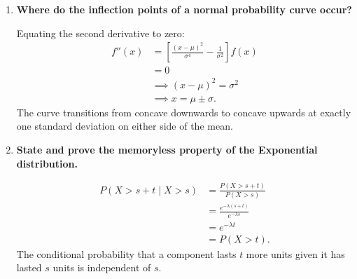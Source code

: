 \documentclass[12pt,a4paper]{article}
\newcommand{\Q}[1]{\textbf{#1}\par\noindent\ignorespaces}
\begin{document}
\begin{tcolorbox}[exambox, title={\textbf{Frequently Asked / Viva Questions}}]
\begin{enumerate}[topsep=0pt, label=\textbf{Q\arabic*.}, itemsep=5pt]
  \item \Q{Where do the inflection points of a normal probability curve occur?}
  Equating the second derivative to zero:
  \[
    \begin{aligned}
      f''(x) &= \left[\frac{(x-\mu)^2}{\sigma^4} - \frac{1}{\sigma^2}\right] f(x) \\[3pt]
      &= 0 \\[3pt]
      &\implies (x-\mu)^2 = \sigma^2 \\[3pt]
      &\implies x = \mu \pm \sigma.
    \end{aligned}
  \]
   The curve transitions from concave downwards to concave upwards at exactly one standard deviation on either side of the mean.

  \item \Q{State and prove the memoryless property of the Exponential distribution.}

  \[
    \begin{aligned}
      P(X > s + t \mid X > s) &= \frac{P(X > s + t)}{P(X > s)} \\[3pt]
      &= \frac{e^{-\lambda(s+t)}}{e^{-\lambda s}} \\[3pt]
      &= e^{-\lambda t} \\[3pt]
      &= P(X > t).
    \end{aligned}
  \]
   The conditional probability that a component lasts $t$ more units given it has lasted $s$ units is independent of $s$.


\end{enumerate}
\end{tcolorbox}
\end{document}
